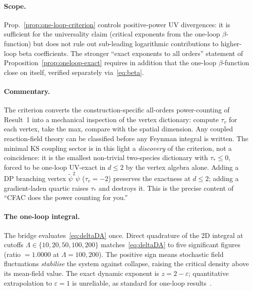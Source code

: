 \documentclass[11pt,a4paper]{article}
\newcommand{\psit}{\tilde\psi}
\theoremstyle{plain}
\begin{document}
\paragraph{Scope.}
Prop.~\ref{prop:one-loop-criterion} controls positive-power UV
divergences: it is sufficient for the universality claim
(critical exponents from the one-loop $\beta$-function) but does
not rule out sub-leading logarithmic contributions to higher-loop
beta coefficients.  The stronger ``exact exponents to all orders''
statement of Proposition~\ref{prop:oneloop-exact} requires in
addition that the one-loop $\beta$-function close on itself,
verified separately via~\eqref{eq:beta}.

\paragraph{Commentary.}
The criterion converts the construction-specific all-orders
power-counting of Result~1 into a mechanical inspection of the
vertex dictionary: compute $\tau_v$ for each vertex, take the
max, compare with the spatial dimension.  Any coupled
reaction-field theory can be classified before any Feynman
integral is written.  The minimal KS coupling sector is in this
light a \emph{discovery} of the criterion, not a coincidence: it
is the smallest non-trivial two-species dictionary with
$\tau_\ast \leq 0$, forced to be one-loop UV-exact in $d \leq 2$
by the vertex algebra alone.  Adding a DP branching vertex
$\psit^2\psi$ ($\tau_v = -2$) preserves the exactness at $d\leq 2$;
adding a gradient-laden quartic raises $\tau_\ast$ and destroys
it.  This is the precise content of ``CFAC does the power
counting for you.''

\paragraph{The one-loop integral.}
The bridge evaluates~\eqref{eq:deltaDA} once.  Direct quadrature
of the 2D integral at cutoffs
$\Lambda \in \{10, 20, 50, 100, 200\}$ matches~\eqref{eq:deltaDA}
to five significant figures (ratio $=1.0000$ at $\Lambda = 100,
200$).  The positive sign means stochastic field fluctuations
\emph{stabilise} the system against collapse, raising the
critical density above its mean-field value.  The exact dynamic
exponent is $z = 2 - \varepsilon$; quantitative extrapolation to
$\varepsilon = 1$ is unreliable, as standard for one-loop
results~\cite{Tauber}.
\end{document}
